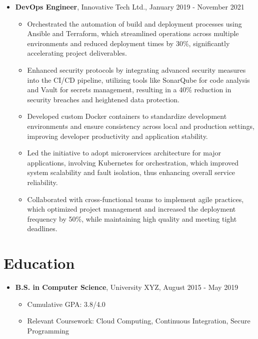 \documentclass[a4paper,10pt]{article}
\begin{document}
\begin{itemize}
  \item \textbf{DevOps Engineer}, Innovative Tech Ltd., January 2019 - November 2021
        \begin{itemize}
            \item Orchestrated the automation of build and deployment processes using Ansible and Terraform, which streamlined operations across multiple environments and reduced deployment times by 30\%, significantly accelerating project deliverables.
            \item Enhanced security protocols by integrating advanced security measures into the CI/CD pipeline, utilizing tools like SonarQube for code analysis and Vault for secrets management, resulting in a 40\% reduction in security breaches and heightened data protection.
            \item Developed custom Docker containers to standardize development environments and ensure consistency across local and production settings, improving developer productivity and application stability.
            \item Led the initiative to adopt microservices architecture for major applications, involving Kubernetes for orchestration, which improved system scalability and fault isolation, thus enhancing overall service reliability.
            \item Collaborated with cross-functional teams to implement agile practices, which optimized project management and increased the deployment frequency by 50\%, while maintaining high quality and meeting tight deadlines.
        \end{itemize}

\end{itemize}

\section*{Education}
\begin{itemize}
  \item \textbf{B.S. in Computer Science}, University XYZ, August 2015 - May 2019
        \begin{itemize}
            \item Cumulative GPA: 3.8/4.0
            \item Relevant Coursework: Cloud Computing, Continuous Integration, Secure Programming
        \end{itemize}
\end{itemize}
\end{document}
